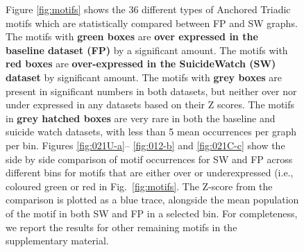 \begin{figure}
	\centering
	
    
    
\caption{
Figure \ref{fig:motifs} shows the 36 different types of Anchored Triadic motifs which are statistically compared between FP and SW graphs. The motifs with \textbf{green boxes} are \textbf{over expressed in the baseline dataset (FP)} by a significant amount. The motifs with \textbf{red boxes} are \textbf{over-expressed in the SuicideWatch (SW) dataset} by significant amount. The motifs with \textbf{grey boxes} are present in significant numbers in both datasets, but neither over nor under expressed in any datasets based on their Z scores. The motifs in \textbf{grey hatched boxes} are very rare in both the baseline and suicide watch datasets, with less than 5 mean occurrences per graph per bin.
Figures \ref{fig:021U-a}--%
\ref{fig:012-b}  and \ref{fig:021C-c} show the side by side comparison of motif occurrences for SW and FP across different bins for motifs that are either over or underexpressed (i.e., coloured green or red in Fig.~\ref{fig:motifs}. The Z-score from the comparison is plotted as a blue trace, alongside the mean population of the motif in both SW and FP in a selected bin. For completeness, we report the results for other remaining motifs in the supplementary material.}
\label{Fig:motif_expressed}
\end{figure}